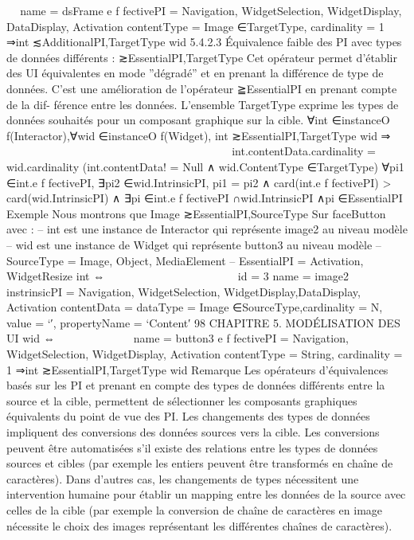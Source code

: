 \documentclass{article}
\begin{document}


name = dsFrame
e f fectivePI = {Navigation, WidgetSelection,
WidgetDisplay, DataDisplay,
Activation}
contentType = Image ∈TargetType,
cardinality = 1
⇒int ≲AdditionalPI,TargetType wid
5.4.2.3
Équivalence faible des PI avec types de données différents : ≳EssentialPI,TargetType
Cet opérateur permet d’établir des UI équivalentes en mode ”dégradé” et en prenant la différence
de type de données. C’est une amélioration de l’opérateur ≧EssentialPI en prenant compte de la dif-
férence entre les données. L’ensemble TargetType exprime les types de données souhaités pour un
composant graphique sur la cible.
∀int ∈instanceO f(Interactor),∀wid ∈instanceO f(Widget),
int ≳EssentialPI,TargetType wid ⇒



































int.contentData.cardinality = wid.cardinality
(int.contentData! = Null
∧
wid.ContentType ∈TargetType)
∀pi1 ∈int.e f fectivePI,
∃pi2 ∈wid.IntrinsicPI,
pi1 = pi2
∧
card(int.e f fectivePI) > card(wid.IntrinsicPI)
∧
∃pi ∈int.e f fectivePI ∩wid.IntrinsicPI ∧pi ∈EssentialPI
Exemple
Nous montrons que Image ≳EssentialPI,SourceType Sur faceButton avec :
– int est une instance de Interactor qui représente image2 au niveau modèle
– wid est une instance de Widget qui représente button3 au niveau modèle
– SourceType = {Image, Object, MediaElement}
– EssentialPI = {Activation, WidgetResize}
int ⇔



















id = 3
name = image2
instrinsicPI = {Navigation, WidgetSelection,
WidgetDisplay,DataDisplay,
Activation}
contentData = {dataType = Image ∈SourceType,cardinality = N,
value = ‘′, propertyName = ‘Content′}
98
CHAPITRE 5. MODÉLISATION DES UI
wid ⇔











name = button3
e f fectivePI = {Navigation, WidgetSelection,
WidgetDisplay, Activation}
contentType = String,
cardinality = 1
⇒int ≳EssentialPI,TargetType wid
Remarque
Les opérateurs d’équivalences basés sur les PI et prenant en compte des types de données
différents entre la source et la cible, permettent de sélectionner les composants graphiques équivalents
du point de vue des PI. Les changements des types de données impliquent des conversions des données
sources vers la cible. Les conversions peuvent être automatisées s’il existe des relations entre les types
de données sources et cibles (par exemple les entiers peuvent être transformés en chaîne de caractères).
Dans d’autres cas, les changements de types nécessitent une intervention humaine pour établir un
mapping entre les données de la source avec celles de la cible (par exemple la conversion de chaîne de
caractères en image nécessite le choix des images représentant les différentes chaînes de caractères).
\end{document}
